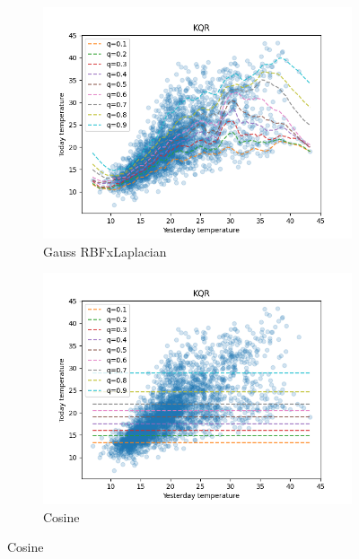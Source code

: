 \begin{figure}[!h]
\begin{subfigure}[b]{0.5\linewidth}
    \end{subfigure} 
    \begin{subfigure}[b]{0.5\linewidth}
        \centering
        \includegraphics[width=1.1\textwidth]{images/melborune_gaussian_rbf_x_laplacian_kernel_quantile_regression.png} 
        \caption{Gauss RBFxLaplacian} 
        \label{} 
        \vspace{4ex}
    \end{subfigure}%
    \begin{subfigure}[b]{0.5\linewidth}
        \centering
        \includegraphics[width=1.1\textwidth]{images/melborune_cosine_kernel_quantile_regression.png}
        \caption{Cosine} 
        \label{} 
        \vspace{4ex}

\end{subfigure}
\end{figure}
